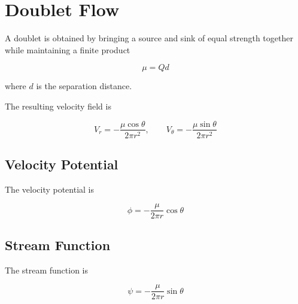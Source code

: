 \section{Doublet Flow}
\label{sec:doublet-flow}

A doublet is obtained by bringing a source and sink of equal strength
together while maintaining a finite product

\[
\mu = Qd
\]

where $d$ is the separation distance.

\bigskip

The resulting velocity field is

\[
V_r
=
-\frac{\mu\cos\theta}{2\pi r^2},
\qquad
V_\theta
=
-\frac{\mu\sin\theta}{2\pi r^2}
\]

\subsection{Velocity Potential}
\label{subsec:doubler-flow-velocity-potential}

The velocity potential is

\[
\boxed{
\phi
=
-\frac{\mu}{2\pi r}\cos\theta
}
\]

\subsection{Stream Function}
\label{subsec:doublet-flow-stream-function}

The stream function is

\[
\boxed{
\psi
=
-\frac{\mu}{2\pi r}\sin\theta
}
\]
